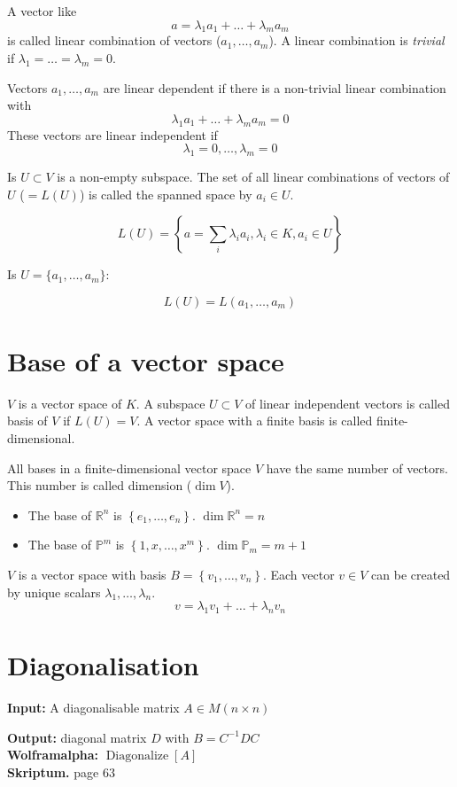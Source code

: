 \documentclass[a4paper,twocolumn]{article}
\newcommand{\set}[1]{\left\{#1\right\}}
\newcommand{\io}[2]{{\par\noindent\textbf{Input:} #1 \\}{\textbf{Output:} #2 \\}}
\newcommand{\wa}[1]{\textbf{Wolframalpha:} $#1$ \\}
\newcommand{\scriptref}[1]{\textbf{Skriptum.} page #1 \\}
\begin{document}
A vector like
%
\[
    a = \lambda_1 a_1 + \ldots + \lambda_m a_m
\]
%
is called linear combination of vectors ($a_1,\ldots,a_m$). A linear
combination is \emph{trivial} if $\lambda_1 = \ldots = \lambda_m = 0$.

Vectors $a_1,\ldots,a_m$ are linear dependent if there is a non-trivial
linear combination with
%
\[
    \lambda_1 a_1 + \ldots + \lambda_m a_m = 0
\]
%
These vectors are linear independent if 
%
\[
    \lambda_1 = 0, \ldots, \lambda_m = 0
\]

Is $U \subset V$ is a non-empty subspace. The set of all linear combinations
of vectors of $U$ ($= L(U)$) is called the spanned space by $a_i \in U$.

\[
    L(U) = \left\{ a = \sum_i \lambda_i a_i,
            \lambda_i \in K, a_i \in U\right\}
\]

Is $U = \{a_1,\ldots,a_m\}$:

\[
    L(U) = L(a_1, \ldots, a_m)
\]

\section{Base of a vector space}

$V$ is a vector space of $K$. A subspace $U \subset V$ of linear
independent vectors is called basis of $V$ if $L(U) = V$.
A vector space with a finite basis is called finite-dimensional.

All bases in a finite-dimensional vector space $V$ have the same number
of vectors. This number is called dimension ($\dim{V}$).

\begin{itemize}
  \item The base of $\mathbb{R}^n$ is $\set{e_1,\ldots,e_n}$.
        $\dim{\mathbb{R}^n} = n$
  \item The base of $\mathbb{P}^m$ is $\set{1, x,\ldots,x^m}$.
        $\dim{\mathbb{P}_m} = m + 1$
\end{itemize}

$V$ is a vector space with basis $B = \set{v_1,\ldots,v_n}$. Each vector
$v \in V$ can be created by unique scalars $\lambda_1,\ldots,\lambda_n$.
%
\[
    v = \lambda_1 v_1 + \ldots + \lambda_n v_n
\]

\section{Diagonalisation}

\io{A diagonalisable matrix $A \in M(n\times n)$}
   {diagonal matrix $D$ with $B = C^{-1}DC$}
\wa{\operatorname{Diagonalize}[A]}
\scriptref{63}
\end{document}
